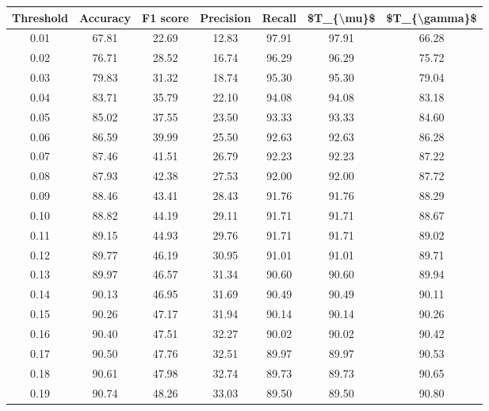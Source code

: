\begin{tabular}{|c|c|c|c|c|c|c|}
\toprule
 Threshold &  Accuracy &  F1 score &  Precision &  Recall &  \$T\_\{\textbackslash mu\}\$ &  \$T\_\{\textbackslash gamma\}\$ \\
\hline
      0.01 &     67.81 &     22.69 &      12.83 &   97.91 &      97.91 &         66.28 \\
      0.02 &     76.71 &     28.52 &      16.74 &   96.29 &      96.29 &         75.72 \\
      0.03 &     79.83 &     31.32 &      18.74 &   95.30 &      95.30 &         79.04 \\
      0.04 &     83.71 &     35.79 &      22.10 &   94.08 &      94.08 &         83.18 \\
      0.05 &     85.02 &     37.55 &      23.50 &   93.33 &      93.33 &         84.60 \\
      0.06 &     86.59 &     39.99 &      25.50 &   92.63 &      92.63 &         86.28 \\
      0.07 &     87.46 &     41.51 &      26.79 &   92.23 &      92.23 &         87.22 \\
      0.08 &     87.93 &     42.38 &      27.53 &   92.00 &      92.00 &         87.72 \\
      0.09 &     88.46 &     43.41 &      28.43 &   91.76 &      91.76 &         88.29 \\
      0.10 &     88.82 &     44.19 &      29.11 &   91.71 &      91.71 &         88.67 \\
      0.11 &     89.15 &     44.93 &      29.76 &   91.71 &      91.71 &         89.02 \\
      0.12 &     89.77 &     46.19 &      30.95 &   91.01 &      91.01 &         89.71 \\
      0.13 &     89.97 &     46.57 &      31.34 &   90.60 &      90.60 &         89.94 \\
      0.14 &     90.13 &     46.95 &      31.69 &   90.49 &      90.49 &         90.11 \\
      0.15 &     90.26 &     47.17 &      31.94 &   90.14 &      90.14 &         90.26 \\
      0.16 &     90.40 &     47.51 &      32.27 &   90.02 &      90.02 &         90.42 \\
      0.17 &     90.50 &     47.76 &      32.51 &   89.97 &      89.97 &         90.53 \\
      0.18 &     90.61 &     47.98 &      32.74 &   89.73 &      89.73 &         90.65 \\
      0.19 &     90.74 &     48.26 &      33.03 &   89.50 &      89.50 &         90.80 \\

\end{tabular}
